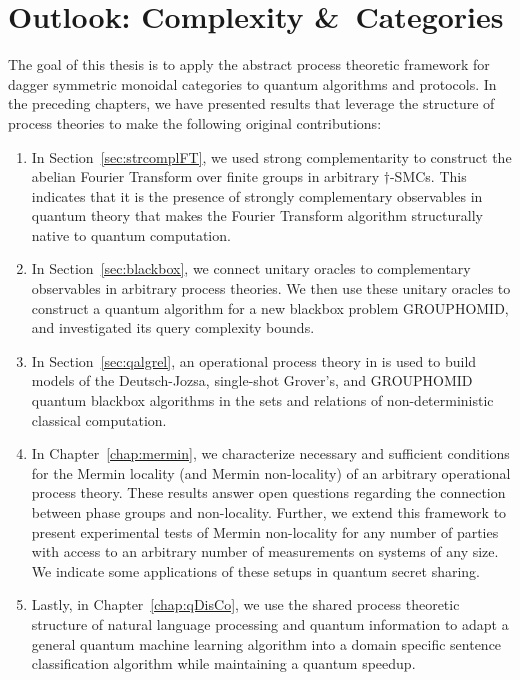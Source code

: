 \chapter{Outlook: Complexity \&\ Categories}
\label{chap:outlook}

The goal of this thesis is to apply the abstract process theoretic framework for dagger symmetric monoidal categories to quantum algorithms and protocols.  In the preceding chapters, we have presented results that leverage the structure of process theories to make the following original contributions:
\begin{enumerate}
\item In Section~\ref{sec:strcomplFT}, we used strong complementarity to construct the abelian Fourier Transform over finite groups in arbitrary $\dagger$-SMCs. This indicates that it is the presence of strongly complementary observables in quantum theory that makes the Fourier Transform algorithm structurally native to quantum computation.

\item In Section~\ref{sec:blackbox}, we connect unitary oracles to complementary observables in arbitrary process theories. We then use these unitary oracles to construct a quantum algorithm for a new blackbox problem GROUPHOMID, and investigated its query complexity bounds.

\item In Section~\ref{sec:qalgrel}, an operational process theory in  is used to build models of the Deutsch-Jozsa, single-shot Grover's, and GROUPHOMID quantum blackbox algorithms in the sets and relations of non-deterministic classical computation.

\item In Chapter~\ref{chap:mermin}, we characterize necessary and sufficient conditions for the Mermin locality (and Mermin non-locality) of an arbitrary operational process theory. These results answer open questions regarding the connection between phase groups and non-locality. Further, we extend this framework to present experimental tests of Mermin non-locality for any number of parties with access to an arbitrary number of measurements on systems of any size. We indicate some applications of these setups in quantum secret sharing.

\item Lastly, in Chapter~\ref{chap:qDisCo}, we use the shared process theoretic structure of natural language processing and quantum information to adapt a general quantum machine learning algorithm into a domain specific sentence classification algorithm while maintaining a quantum speedup.
\end{enumerate}

